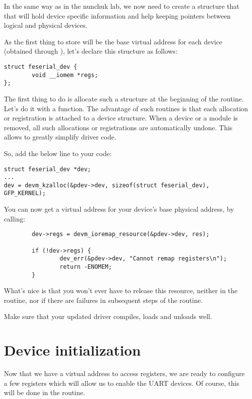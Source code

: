 In the same way as in the nunchuk lab, we now need to create a
structure that that will hold device specific information and help
keeping pointers between logical and physical devices.

As the first thing to store will be the base virtual address for
each device (obtained through ), let's declare this
structure as follows:

\begin{verbatim}
struct feserial_dev {
        void __iomem *regs;
};
\end{verbatim}

The first thing to do is allocate such a structure at the beginning
of the  routine. Let's do it with a  function.
The advantage of such routines is that each allocation or registration
is attached to a device structure. When a device or a module is removed,
all such allocations or registrations are automatically undone. This
allows to greatly simplify driver code.

So, add the below line to your code:

\begin{verbatim}
struct feserial_dev *dev;
...
dev = devm_kzalloc(&pdev->dev, sizeof(struct feserial_dev), GFP_KERNEL);
\end{verbatim}

You can now get a virtual address for your device's base physical
address, by calling:

\begin{verbatim}
        dev->regs = devm_ioremap_resource(&pdev->dev, res);

        if (!dev->regs) {
                dev_err(&pdev->dev, "Cannot remap registers\n");
                return -ENOMEM;
        }
\end{verbatim}

What's nice is that you won't ever have to release this resource,
neither in the  routine, nor if there are failures
in subsequent steps of the  routine.

Make sure that your updated driver compiles, loads and unloads well.

\section{Device initialization}

Now that we have a virtual address to access registers, we are ready to
configure a few registers which will allow us to enable the UART
devices. Of course, this will be done in the  routine.


